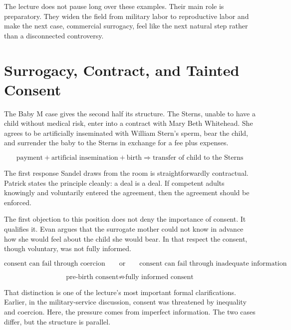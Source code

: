 The lecture does not pause long over these examples. Their main role is preparatory. They widen the field from military labor to reproductive labor and make the next case, commercial surrogacy, feel like the next natural step rather than a disconnected controversy.

\section{Surrogacy, Contract, and Tainted Consent}

The Baby M case gives the second half its structure. The Sterns, unable to have a child without medical risk, enter into a contract with Mary Beth Whitehead. She agrees to be artificially inseminated with William Stern's sperm, bear the child, and surrender the baby to the Sterns in exchange for a fee plus expenses.

\begin{equation}
\text{payment} + \text{artificial insemination} + \text{birth} \Longrightarrow \text{transfer of child to the Sterns}
\end{equation}

The first response Sandel draws from the room is straightforwardly contractual. Patrick states the principle cleanly: a deal is a deal. If competent adults knowingly and voluntarily entered the agreement, then the agreement should be enforced.

The first objection to this position does not deny the importance of consent. It qualifies it. Evan argues that the surrogate mother could not know in advance how she would feel about the child she would bear. In that respect the consent, though voluntary, was not fully informed.

\begin{equation}
\text{consent can fail through coercion}
\qquad \text{or} \qquad
\text{consent can fail through inadequate information}
\end{equation}

\begin{equation}
\text{pre-birth consent} \not\Rightarrow \text{fully informed consent}
\end{equation}

That distinction is one of the lecture's most important formal clarifications. Earlier, in the military-service discussion, consent was threatened by inequality and coercion. Here, the pressure comes from imperfect information. The two cases differ, but the structure is parallel.

